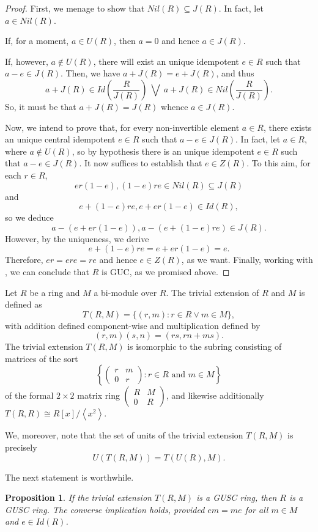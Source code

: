 \documentclass[12pt]{amsart}
\newtheorem{proposition}[theorem]{Proposition}
\theoremstyle{definition}
\begin{document}
\begin{proof}
First, we menage to show that $Nil(R)\subseteq J(R)$. In fact, let $a\in Nil(R)$.

If, for a moment, $a\in U(R)$, then $a=0$ and hence $a\in J(R)$.

If, however, $a\not\in U(R)$, there will exist an unique idempotent $e\in R$ such that $a-e\in J(R)$. Then, we have $a+J(R)=e+J(R)$, and thus $$a+J(R)\in Id(\dfrac{R}{J(R)}) ~ \bigvee ~ a+J(R)\in Nil(\dfrac{R}{J(R)}).$$ So, it must be that $a+J(R)=J(R)$ whence $a\in J(R)$.

Now, we intend to prove that, for every non-invertible element $a\in R$, there exists an unique central idempotent $e\in R$ such that $a-e\in J(R)$. In fact, let $a\in R$, where $a\not\in U(R)$, so by hypothesis there is an unique idempotent $e\in R$ such that $a-e\in J(R)$. It now suffices to establish that $e\in Z(R)$. To this aim, for each $r\in R$, $$er(1-e), (1-e)re\in Nil(R)\subseteq J(R)$$ and $$e+(1-e)re, e+er(1-e)\in Id(R),$$ so we deduce $$a-(e+er(1-e)),a-(e+(1-e)re)\in J(R).$$ However, by the uniqueness, we derive $$e+(1-e)re=e+er(1-e)=e.$$ Therefore, $er=ere=re$ and hence $e\in Z(R)$, as we want. Finally, working with \cite[Theorem 3.5]{1}, we can conclude that $R$ is GUC, as we promised above.
\end{proof}

Let $R$ be a ring and $M$ a bi-module over $R$. The trivial extension of $R$ and $M$ is defined as
\[ T(R, M) = \{(r, m) : r \in R \vee m \in M\}, \]
with addition defined component-wise and multiplication defined by
\[ (r, m)(s, n) = (rs, rn + ms). \]
The trivial extension $T(R, M)$ is isomorphic to the subring consisting of matrices of the sort
\[ \left\{ \begin{pmatrix} r & m \\ 0 & r \end{pmatrix} : r \in R \text{ and } m \in M \right\} \]
of the formal $2 \times 2$ matrix ring $\begin{pmatrix} R & M \\ 0 & R \end{pmatrix}$, and likewise additionally $T(R, R) \cong R[x]/\left\langle x^2 \right\rangle$.

We, moreover, note that the set of units of the trivial extension $T(R, M)$ is precisely
\[ U(T(R, M)) = T(U(R), M). \]

\noindent The next statement is worthwhile.

\begin{proposition}\label{prop2.22}
If the trivial extension $T(R,M)$ is a GUSC ring, then $R$ is a GUSC ring. The converse implication holds, provided $em=me$ for all $m\in M$ and $e\in Id(R)$.
\end{proposition}
\end{document}
